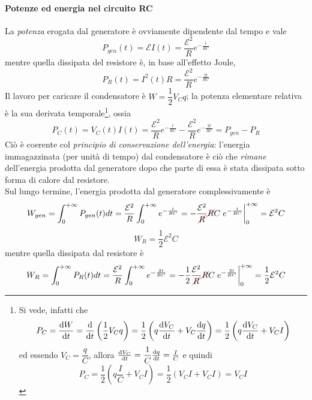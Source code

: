 \paragraph{Potenze ed energia nel circuito RC}
La \textit{potenza} erogata dal generatore è ovviamente dipendente dal tempo e vale
\begin{equation}
	P_{gen}(t)=\mathcal{E}I(t)=\frac{\mathcal{E}^2}{R}e^{-\frac{t}{RC}}
\end{equation}
mentre quella dissipata del resistore è, in base all'effetto Joule,
\begin{equation}
	P_{R}(t)=I^2(t)R=\frac{\mathcal{E}^2}{R}e^{-\frac{2t}{RC}}
\end{equation}
Il lavoro per caricare il condensatore è $W=\dfrac{1}{2}V_Cq$; la potenza elementare relativa è la sua derivata temporale\footnote{Si vede, infatti che
\begin{equation*}
	P_{C}=\dv{W}{t}=\dv{t}\left(\frac{1}{2}V_Cq\right)=\frac{1}{2}\left(q\dv{V_C}{t}+V_C\dv{q}{t}\right)=\frac{1}{2}\left(q\dv{V_C}{t}+V_CI\right)
\end{equation*}
ed essendo $V_C=\dfrac{q}{C}$, allora $\dv{V_C}{t}=\dfrac{1}{C}\dv{q}{t}=\frac{I}{C}$ e quindi
\begin{equation*}
	P_{C}=\frac{1}{2}\left(q\frac{I}{C}+V_CI\right)=\frac{1}{2}\left(V_CI+V_CI\right)=V_CI
\end{equation*}}, ossia 
\begin{equation}
	P_{C}(t)=V_C(t)I(t)=\frac{\mathcal{E}^2}{R}e^{-\frac{t}{RC}}-\frac{\mathcal{E}^2}{R}e^{-\frac{2t}{RC}}=P_{gen}-P_{R}
\end{equation}
Ciò è coerente col \textit{principio di conservazione dell'energia}: l'energia immagazzinata (per unità di tempo) dal condensatore è ciò che \textit{rimane} dell'energia prodotta dal generatore dopo che parte di essa è stata dissipata sotto forma di calore dal resistore.\\
Sul lungo termine, l'energia prodotta dal generatore complessivamente è
\begin{equation*}
	W_{gen}=\int_{0}^{+\infty}P_{gen}(t)dt=\frac{\mathcal{E}^2}{R}\int_{0}^{+\infty}e^{-\frac{t}{RC}}=-\frac{\mathcal{E}^2}{\Ccancel[red]{R}}\Ccancel[red]{R}C\eval{e^{-\frac{t}{RC}}}_{0}^{+\infty}=\mathcal{E}^2C
\end{equation*}
\begin{equation}
	W_{R}=\frac{1}{2}\mathcal{E}^2C
\end{equation}
mentre quella dissipata dal resistore è
\begin{equation*}
	W_{R}=\int_{0}^{+\infty}P_{R}(t)dt=\frac{\mathcal{E}^2}{R}\int_{0}^{+\infty}e^{-\frac{2t}{RC}}=-\frac{1}{2}\frac{\mathcal{E}^2}{\Ccancel[red]{R}}\Ccancel[red]{R}C\eval{e^{-\frac{2t}{RC}}}_{0}^{+\infty}=\frac{1}{2}\mathcal{E}^2C
\end{equation*}

